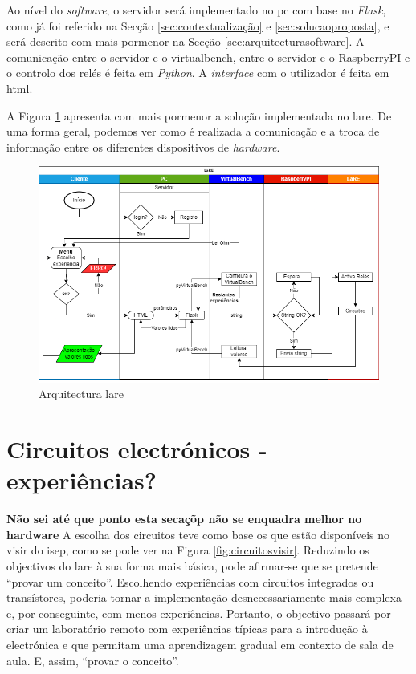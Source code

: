 Ao nível do \textit{software}, o servidor será implementado no \acrshort{pc} com base no \textit{Flask}, como já foi referido na Secção \ref{sec:contextualização} e \ref{sec:solucaoproposta}, e será descrito com mais pormenor na Secção \ref{sec:arquitecturasoftware}. A comunicação entre o servidor e o \acrshort{virtualbench}, entre o servidor e o \gls{RaspberryPI} e o controlo dos relés é feita em \textit{Python}. A \textit{interface} com o utilizador é feita em \acrshort{html}.

A Figura {\ref{fig:arquitecturalore}} apresenta com mais pormenor a solução implementada no \acrshort{lare}. De uma forma geral, podemos ver como é realizada a comunicação e a troca de informação entre os diferentes dispositivos de \textit{hardware}.

\begin{figure}[hbtp]
    \centering
    \includegraphics[width=1\textwidth]{figures/Diagrama_SOFTWARE.drawio.png}
    \caption{Arquitectura \acrshort{lare}}
    \label{fig:arquitecturalore}
\end{figure}

\section{Circuitos electrónicos - experiências?}
\label{sec:circuitos}
\textbf{Não sei até que ponto esta secaçõp não se enquadra melhor no hardware}
A escolha dos circuitos teve como base os que estão disponíveis no \acrshort{visir} do \acrshort{isep}, como se pode ver na Figura \ref{fig:circuitosvisir}. Reduzindo os objectivos do \acrshort{lare} à sua forma mais básica, pode afirmar-se que se pretende ``provar um conceito''. Escolhendo experiências com circuitos integrados ou transístores, poderia tornar a implementação desnecessariamente mais complexa e, por conseguinte, com menos experiências. Portanto, o objectivo passará por criar um \acrshort{laboratório remoto} com experiências típicas para a introdução à electrónica e que permitam uma aprendizagem gradual em contexto de sala de aula. E, assim, ``provar o conceito''.

